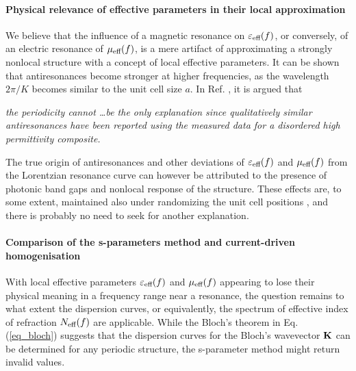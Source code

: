 \paragraph{Physical relevance of effective parameters in their local approximation}%
We believe that the influence of a magnetic resonance on $\varepsilon_{\text{eff} }(f)$, or conversely, of an electric resonance of $\mu_{\text{eff} }(f)$, is a mere artifact of approximating a strongly nonlocal structure with a concept of local effective parameters. It can be shown that antiresonances become stronger at higher frequencies, as the wavelength $2\pi/K$ becomes similar to the unit cell size $a$. 
In Ref. \cite{wallen2011anti}, it is argued that %
\begin{displayquote}
\textit{the periodicity cannot \ldots be the only explanation since qualitatively similar antiresonances have been reported using the measured data for a disordered high permittivity composite.}
\end{displayquote}
The true origin of antiresonances and other deviations of $\varepsilon_{\text{eff} }(f)$ and $\mu_{\text{eff} }(f)$ from the Lorentzian resonance curve can however be attributed to the presence of photonic band gaps and nonlocal response of the structure. These effects are, to some extent, maintained also under randomizing the unit cell positions \cite{peng2007},   
and there is probably no need to seek for another explanation. %


\paragraph{Comparison of the s-parameters method and current-driven homogenisation}%
With local effective parameters $\varepsilon_{\text{eff} }(f)$ and $\mu_{\text{eff} }(f)$ appearing to lose their physical meaning in a frequency range near a resonance, the question remains to what extent the dispersion curves, or equivalently, the spectrum of effective index of refraction $N_{\text{eff} }(f)$ are applicable. While the Bloch's theorem in Eq. (\ref{eq_bloch}) suggests that the dispersion curves for the Bloch's wavevector ${\mathbf{K}}$ can be determined for any periodic structure, the s-parameter method might return invalid values.

